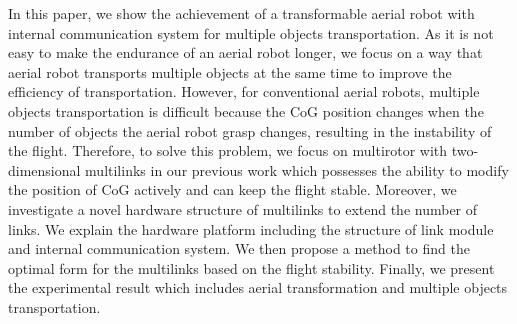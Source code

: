 In this paper, we show the achievement of a transformable aerial robot with internal communication system for multiple objects transportation. As it is not easy to make the endurance of an aerial robot longer, we focus on a way that aerial robot transports multiple objects at the same time to improve the efficiency of transportation. However, for conventional aerial robots, multiple objects transportation is difficult because the CoG position changes when the number of objects the aerial robot grasp changes, resulting in the instability of the flight. Therefore, to solve this problem, we focus on multirotor with two-dimensional multilinks in our previous work which possesses the ability to modify the position of CoG actively and can keep the flight stable. Moreover, we investigate a novel hardware structure of multilinks to extend the number of links. We explain the hardware platform including the structure of link module and internal communication system. We then propose a method to find the optimal form for the multilinks based on the flight stability. Finally, we present the experimental result which includes aerial transformation and multiple objects transportation.
